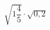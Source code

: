 \begin{ex}[type=calculate]
	\begin{condition}
		\( \sqrt{1\dfrac{4}{5}}\cdot\sqrt{0,2} \)
	\end{condition}
\end{ex}